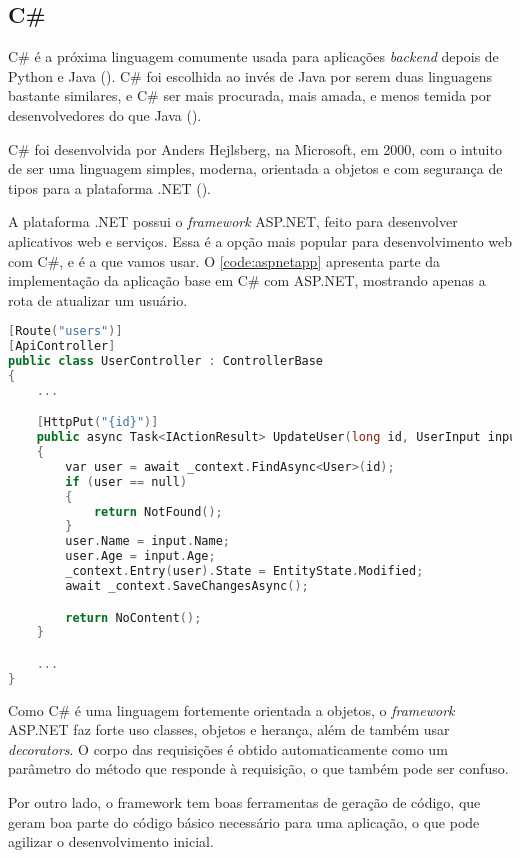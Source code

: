 \subsection{C\#}

C\# é a próxima linguagem comumente usada para aplicações \textit{backend} depois
de Python e Java (\textcite{tiobeindex}). C\# foi escolhida ao invés de Java por
serem duas linguagens bastante similares, e C\# ser mais procurada, mais amada,
e menos temida por desenvolvedores do que Java (\textcite{stackoverflowsurvey}).

C\# foi desenvolvida por Anders Hejlsberg, na Microsoft, em 2000, com o intuito
de ser uma linguagem simples, moderna, orientada a objetos e com segurança de tipos
para a plataforma .NET (\textcite{csharpmanual}).

A plataforma .NET possui o \textit{framework} ASP.NET, feito para desenvolver
aplicativos web e serviços. Essa é a opção mais popular para desenvolvimento web
com C\#, e é a que vamos usar. O \autoref{code:aspnetapp} apresenta parte da implementação
da aplicação base em C\# com ASP.NET, mostrando apenas a rota de atualizar um
usuário.

\begin{lstlisting}[language=C++,label={code:aspnetapp},caption={Aplicação base em C\# com ASP.NET}]
[Route("users")]
[ApiController]
public class UserController : ControllerBase
{
    ...

    [HttpPut("{id}")]
    public async Task<IActionResult> UpdateUser(long id, UserInput input)
    {
        var user = await _context.FindAsync<User>(id);
        if (user == null)
        {
            return NotFound();
        }
        user.Name = input.Name;
        user.Age = input.Age;
        _context.Entry(user).State = EntityState.Modified;
        await _context.SaveChangesAsync();

        return NoContent();
    }

    ...
}
\end{lstlisting}

Como C\# é uma linguagem fortemente orientada a objetos, o \textit{framework} ASP.NET
faz forte uso classes, objetos e herança, além de também usar \textit{decorators}.
O corpo das requisições é obtido automaticamente como um parâmetro do método que
responde à requisição, o que também pode ser confuso.

Por outro lado, o framework tem boas ferramentas de geração de código, que geram
boa parte do código básico necessário para uma aplicação, o que pode agilizar o
desenvolvimento inicial.

